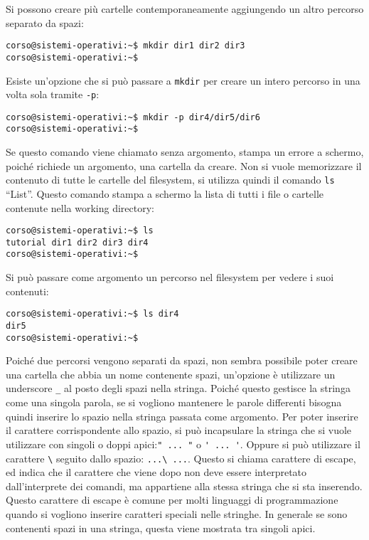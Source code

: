\documentclass{article}
\numberwithin{equation}{subsection}
\begin{document}
Si possono creare più cartelle contemporaneamente aggiungendo un altro percorso separato da spazi:
\begin{verbatim}
corso@sistemi-operativi:~$ mkdir dir1 dir2 dir3
corso@sistemi-operativi:~$
\end{verbatim}

Esiste un'opzione che si può passare a \verb|mkdir| per creare un intero percorso in una volta sola tramite \verb|-p|:
\begin{verbatim}
corso@sistemi-operativi:~$ mkdir -p dir4/dir5/dir6
corso@sistemi-operativi:~$
\end{verbatim}


Se questo comando viene chiamato senza argomento, stampa un errore a schermo, poiché richiede un argomento, una cartella da creare. Non si vuole memorizzare il contenuto di tutte le cartelle del filesystem, si 
utilizza quindi il comando \verb|ls| ``List''. Questo comando stampa a schermo la lista di tutti i file o cartelle contenute nella working directory:
\begin{verbatim}
corso@sistemi-operativi:~$ ls
tutorial dir1 dir2 dir3 dir4
corso@sistemi-operativi:~$
\end{verbatim}
Si può passare come argomento un percorso nel filesystem per vedere i suoi contenuti:
\begin{verbatim}
corso@sistemi-operativi:~$ ls dir4
dir5
corso@sistemi-operativi:~$
\end{verbatim}
Poiché due percorsi vengono separati da spazi, non sembra possibile poter creare una cartella che abbia un nome contenente spazi, un'opzione è utilizzare un underscore \verb|_| al posto degli spazi nella stringa. Poiché 
questo gestisce la stringa come una singola parola, se si vogliono mantenere le parole differenti bisogna quindi inserire lo spazio nella stringa passata come argomento. 
Per poter inserire il carattere corrispondente allo spazio, si può incapsulare la stringa che si vuole utilizzare con singoli o doppi apici:\verb|" ... "| o \verb|' ... '|. Oppure si può utilizzare il carattere 
\verb|\| seguito dallo spazio: \verb|...\ ...|. Questo si chiama carattere di escape, ed indica che il carattere che viene dopo non deve essere interpretato dall'interprete dei comandi, ma appartiene alla stessa 
stringa che si sta inserendo. Questo carattere di escape è comune per molti linguaggi di programmazione quando si vogliono inserire caratteri speciali nelle stringhe. 
In generale se sono contenenti spazi in una stringa, questa viene mostrata tra singoli apici. 
\end{document}
